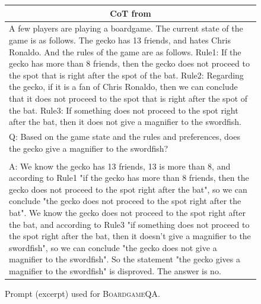 \documentclass{article}
\theoremstyle{definition}
\newcommand{\boardgame}{\textsc{BoardgameQA}}
\begin{document}
\begin{figure}[h]
\begin{tabularx}{\linewidth}{X}
    \midrule
       \multicolumn{1}{c}{ {\sc \textbf{CoT}} from \citet{boardgameqa} }   \\
       \midrule
A few players are playing a boardgame. The current state of the game is as follows. The gecko has 13 friends, and hates Chris Ronaldo. And the rules of the game are as follows. Rule1: If the gecko has more than 8 friends, then the gecko does not proceed to the spot that is right after the spot of the bat. Rule2: Regarding the gecko, if it is a fan of Chris Ronaldo, then we can conclude that it does not proceed to the spot that is right after the spot of the bat. Rule3: If something does not proceed to the spot right after the bat, then it does not give a magnifier to the swordfish. \\
Q: Based on the game state and the rules and preferences, does the gecko give a magnifier to the swordfish?\\
\\
A: We know the gecko has 13 friends, 13 is more than 8, and according to Rule1 "if the gecko has more than 8 friends, then the gecko does not proceed to the spot right after the bat", so we can conclude "the gecko does not proceed to the spot right after the bat". We know the gecko does not proceed to the spot right after the bat, and according to Rule3 "if something does not proceed to the spot right after the bat, then it doesn't give a magnifier to the swordfish", so we can conclude "the gecko does not give a magnifier to the swordfish". So the statement "the gecko gives a magnifier to the swordfish" is disproved. The answer is no.\\
\bottomrule
\end{tabularx}
\caption{Prompt (excerpt) used for \boardgame{}{}. }
\end{figure}

\newpage
\end{document}
